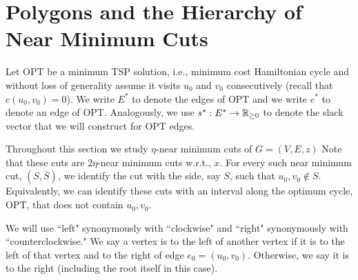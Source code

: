 
\def\es{e^*}
\def\ss{s^*}
\section{Polygons and the Hierarchy of Near Minimum Cuts}
\label{sec:polygons}
Let OPT be a minimum TSP solution, i.e., minimum cost Hamiltonian cycle and without loss of generality assume it visits $u_0$ and $v_0$ consecutively (recall that $c(u_0,v_0)=0$). We write  $E^*$ to denote the edges of OPT and we write $\es$ to denote an edge of OPT. Analogously, we use $\ss:E^*\to\R_{\geq 0}$ to denote the slack vector that we will construct for OPT edges.



Throughout this section we study $\eta$-near minimum cuts of $G=(V,E,z)$ 
Note that these cuts are $2\eta$-near minimum cuts w.r.t., $x$. For every such near minimum cut, $(S,\overline{S})$, we identify the cut with the side, say $S$, such that $u_0,v_0\notin S$. Equivalently, we can identify these cuts with an interval along the optimum cycle, OPT, that does not contain $u_0,v_0$. 

We will use ``left" synonymously with ``clockwise" and ``right" synonymously with ``counterclockwise." We say a vertex is to the left of another vertex if it is to the left of that vertex and to the right of edge $e_0=(u_0,v_0)$. Otherwise, we say it is to the right (including the root itself in this case). 

